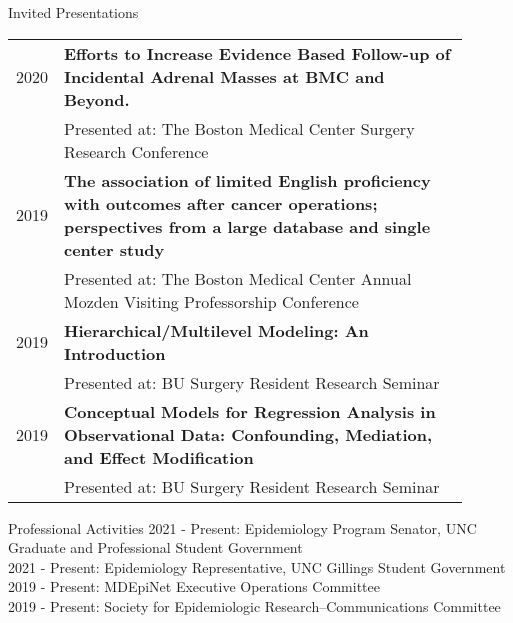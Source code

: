 \documentclass{resume} %
\begin{document}
\begin{rSection}{Invited Presentations}
   \begin{tabular}{lp{0.90\linewidth}}
   2020 & \textbf{Efforts to Increase Evidence Based Follow-up of Incidental Adrenal Masses at BMC and Beyond.}\\
   & Presented at: The Boston Medical Center Surgery Research Conference\\

   2019 & \textbf{The association of limited English proficiency with outcomes after cancer operations; perspectives from a large database and single center study}\\
   & Presented at: The Boston Medical Center Annual Mozden Visiting Professorship Conference\\

   2019 & \textbf{Hierarchical/Multilevel Modeling: An Introduction}\\
   & Presented at: BU Surgery Resident Research Seminar\\

   2019 & \textbf{Conceptual Models for Regression Analysis in Observational Data: Confounding, Mediation, and Effect Modification}\\
   & Presented at: BU Surgery Resident Research Seminar

   \end{tabular}

   \end{rSection}



\begin{rSection}{Professional Activities}
   2021 - Present: Epidemiology Program Senator,  UNC Graduate and Professional Student Government\\ 
   2021 - Present: Epidemiology Representative, UNC Gillings Student Government \\
   2019 - Present: MDEpiNet Executive Operations Committee\\
   2019 - Present: Society for Epidemiologic Research--Communications Committee
   
   \end{rSection}
\end{document}
